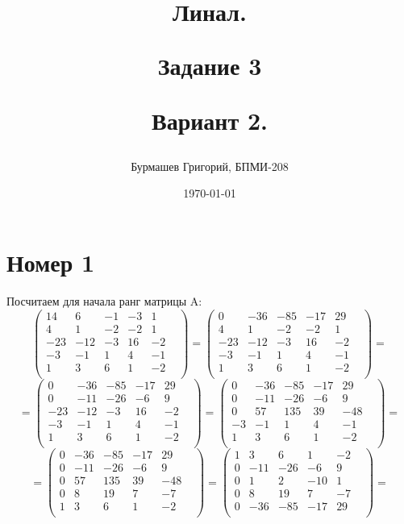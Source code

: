 \documentclass[a4paper,12pt]{article}
\author{Бурмашев Григорий, БПМИ-208}
\title{Линал. 

Задание 3

Вариант 2.}
\date{\today}
\begin{document}
\maketitle
\newpage
\section*{Номер 1}

Посчитаем для начала ранг матрицы A:
\[
\begin{pmatrix}
14 & 6 & -1 & -3 & 1 & \\
4 & 1 & -2 & -2 & 1 & \\
-23 & -12 & -3 & 16 & -2 & \\
-3 & -1 & 1 & 4 & -1 & \\
1 & 3 & 6 & 1 & -2 & \\
\end{pmatrix} 
=
\begin{pmatrix}
0 & -36 & -85 & -17 & 29 & \\
4 & 1 & -2 & -2 & 1 & \\
-23 & -12 & -3 & 16 & -2 & \\
-3 & -1 & 1 & 4 & -1 & \\
1 & 3 & 6 & 1 & -2 & \\
\end{pmatrix}
=
\]
\[
=
\begin{pmatrix}
0 & -36 & -85 & -17 & 29 & \\
0 & -11 & -26 & -6 & 9 & \\
-23 & -12 & -3 & 16 & -2 & \\
-3 & -1 & 1 & 4 & -1 & \\
1 & 3 & 6 & 1 & -2 & \\
\end{pmatrix}
=
\begin{pmatrix}
0 & -36 & -85 & -17 & 29 & \\
0 & -11 & -26 & -6 & 9 & \\
0 & 57 & 135 & 39 & -48 & \\
-3 & -1 & 1 & 4 & -1 & \\
1 & 3 & 6 & 1 & -2 & \\
\end{pmatrix}
=
\]
\[
=
\begin{pmatrix}
0 & -36 & -85 & -17 & 29 & \\
0 & -11 & -26 & -6 & 9 & \\
0 & 57 & 135 & 39 & -48 & \\
0 & 8 & 19 & 7 & -7 & \\
1 & 3 & 6 & 1 & -2 & \\
\end{pmatrix}
=
\begin{pmatrix}
1 & 3 & 6 & 1 & -2 & \\
0 & -11 & -26 & -6 & 9 & \\
0 & 1 & 2 & -10 & 1 & \\
0 & 8 & 19 & 7 & -7 & \\
0 & -36 & -85 & -17 & 29 & \\
\end{pmatrix}
=
\]
\end{document}
